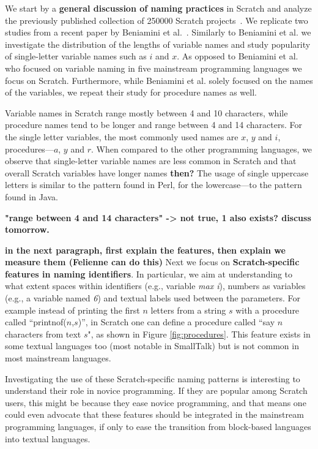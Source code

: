 \documentclass[conference]{IEEEtran}
\newcommand{\todo}[1]{ \textbf{#1} }
\begin{document}
We start by a \textbf{general discussion of naming practices} in Scratch and analyze the previously published collection of 250000 Scratch projects~\cite{Aivaloglou2016HowKC}. 
We replicate two studies from a recent paper by Beniamini et al.~\cite{Beniamini}.
Similarly to Beniamini et al. we investigate the distribution of the lengths of variable names and study popularity of single-letter variable names such as $i$ and $x$.
As opposed to Beniamini et al. who focused on variable naming in five mainstream programming languages we focus on Scratch.
Furthermore, while Beniamini et al. solely focused on the names of the variables, we repeat their study for procedure names as well.

\begin{framed}
Variable names in Scratch range mostly between 4 and 10 characters, while procedure names tend to be longer and range between 4 and 14 characters. 
For the single letter variables, the most commonly used names are $x$, $y$ and $i$, procedures---$a$, $y$ and $r$. 
When compared to the other programming languages, we observe that single-letter variable names are less common in Scratch and that overall Scratch variables have longer names \todo{then?}
The usage of single uppercase letters is similar to the pattern found in Perl, for the lowercase---to the pattern found in Java.
\end{framed}

\todo{"range between 4 and 14 characters" -> not true, 1 also exists? discuss tomorrow.}

\todo{in the next paragraph, first explain the features, then explain we measure them (Felienne can do this)}
Next we focus on \textbf{Scratch-specific features in naming identifiers}.
In particular, we aim at understanding to what extent spaces within identifiers (e.g., variable \emph{max i}), numbers as variables (e.g., a variable named \emph{6}) and textual labels used between the parameters. 
For example instead of printing the first $n$ letters from a string $s$ with a procedure called ``printnof($n$,$s$)'', in Scratch one can define a procedure called ``say $n$ characters from text $s$", as shown in Figure \ref{fig:procedures}. 
This feature exists in some textual languages too (most notable in SmallTalk) but is not common in most mainstream languages. 

Investigating the use of these Scratch-specific naming patterns is interesting to understand their role in novice programming. If they are popular among Scratch users, this might be because they ease novice programming, and that means one could even advocate that these features should be integrated in the mainstream programming languages, if only to ease the transition from block-based languages into textual languages.
\end{document}
